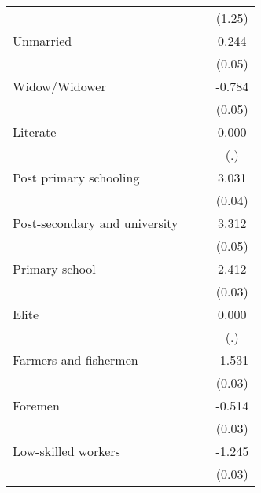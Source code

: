 {\begin{tabular}{l*{3}{c}}
                    &                     &                     &      (1.25)         \\
Unmarried           &                     &                     &       0.244\sym{***}\\
                    &                     &                     &      (0.05)         \\
Widow/Widower       &                     &                     &      -0.784\sym{***}\\
                    &                     &                     &      (0.05)         \\
Literate            &                     &                     &       0.000         \\
                    &                     &                     &         (.)         \\
Post primary schooling&                     &                     &       3.031\sym{***}\\
                    &                     &                     &      (0.04)         \\
Post-secondary and university&                     &                     &       3.312\sym{***}\\
                    &                     &                     &      (0.05)         \\
Primary school      &                     &                     &       2.412\sym{***}\\
                    &                     &                     &      (0.03)         \\
Elite               &                     &                     &       0.000         \\
                    &                     &                     &         (.)         \\
Farmers and fishermen&                     &                     &      -1.531\sym{***}\\
                    &                     &                     &      (0.03)         \\
Foremen             &                     &                     &      -0.514\sym{***}\\
                    &                     &                     &      (0.03)         \\
Low-skilled workers &                     &                     &      -1.245\sym{***}\\
                    &                     &                     &      (0.03)         \\

\end{tabular}}
